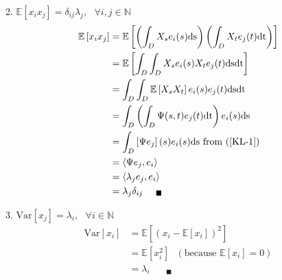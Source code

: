 2. $\mathbb{E}\left[x_i x_j\right] = \delta_{ij} \lambda_j, \text{ }\forall i,j \in \mathbb{N}$
\begin{align}
\mathbb{E}\left[x_i x_j\right] &= \mathbb{E}\left[\left(\int_{D} X_s e_i(s)\mathrm{ds}\right) \left(\int_{D} X_t e_j(t)\mathrm{dt}\right)\right] \nonumber \\
&= \mathbb{E}\left[\int_{D} \int_{D} X_s e_i(s) X_t e_j(t)\mathrm{ds}\mathrm{dt}\right] \nonumber \\
&= \int_{D} \int_{D}\mathbb{E}\left[X_s X_t\right] e_i(s) e_j(t)\mathrm{ds}\mathrm{dt} \nonumber \\
&= \int_{D} \left(\int_{D} \Psi(s,t) e_j(t) \mathrm{dt}\right) e_i(s) \mathrm{ds} \nonumber \\
&= \int_{D} \left[\Psi e_j\right](s) e_i(s) \mathrm{ds} \text{ from (\ref{KL-1})} \nonumber \\
&= \langle \Psi e_j, e_i \rangle \nonumber \\
&= \langle \lambda_j e_j, e_i \rangle \nonumber \\
&= \lambda_j \delta_{ij}  \quad \text{  }_{\blacksquare} \nonumber
\end{align}

3. $\text{Var}\left[x_j\right] = \lambda_i, \text{ }\forall i \in \mathbb{N}$
\begin{align}
\text{Var}\left[x_i\right] &= \mathbb{E}\left[\left(x_i - \mathbb{E}\left[x_i\right]\right)^2\right] \nonumber \\
&= \mathbb{E}\left[x_i^2\right] \text{ } \left(\text{because }\mathbb{E}\left[x_i\right] = 0\right) \nonumber \\
&= \lambda_i \quad \text{  }_{\blacksquare} \nonumber
\end{align}

